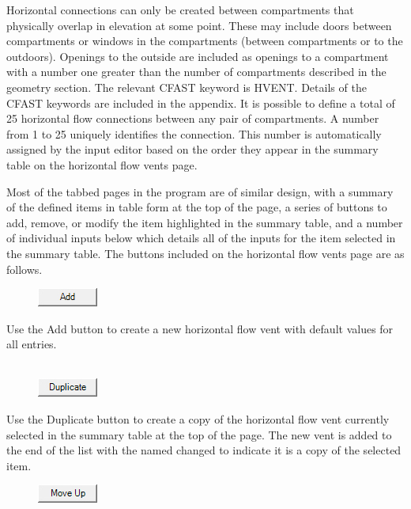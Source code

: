 Horizontal connections can only be created between compartments that physically overlap in elevation at some point. These may include doors between compartments or windows in the compartments (between compartments or to the outdoors).  Openings to the outside are included as openings to a compartment with a number one greater than the number of compartments described in the geometry section.  The relevant CFAST keyword is HVENT.  Details of the CFAST keywords are included in the appendix. It is possible to define a total of 25 horizontal flow connections between any pair of compartments. A number from 1 to 25 uniquely identifies the connection. This number is automatically assigned by the input editor based on the order they appear in the summary table on the horizontal flow vents page.

Most of the tabbed pages in the program are of similar design, with a summary of the defined items in table form at the top of the page, a series of buttons to add, remove, or modify the item highlighted in the summary table, and a number of individual inputs below which details all of the inputs for the item selected in the summary table. The buttons included on the horizontal flow vents page are as follows.

\begin{figure}
  \includegraphics[width=0.781in]{FIGURES/Input_File/Add_Button}
\end{figure}

Use the Add button to create a new horizontal flow vent with default values for all entries. \\~ \\

\begin{figure}
  \includegraphics[width=0.781in]{FIGURES/Input_File/Duplicate_Button}
\end{figure}

Use the Duplicate button to create a copy of the horizontal flow vent currently selected in the summary table at the top of the page. The new vent is added to the end of the list with the named changed to indicate it is a copy of the selected item. \\

\begin{figure}
  \includegraphics[width=0.781in]{FIGURES/Input_File/Move_Up_Button}
\end{figure}

